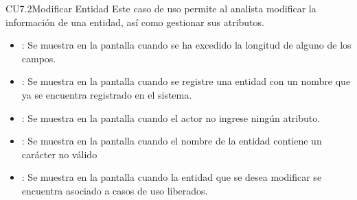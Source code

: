 \begin{UseCase}{CU7.2}{Modificar Entidad}{
		Este caso de uso permite al analista modificar la información de una entidad, así como gestionar sus atributos.
	}
{\begin{itemize}
		\item {}: Se muestra en la pantalla  cuando se ha excedido la longitud de alguno de los campos.
		\item {}: Se muestra en la pantalla  cuando se registre una entidad con un nombre que ya se encuentra registrado en el sistema.
		\item {}: Se muestra en la pantalla  cuando el actor no ingrese ningún atributo.
		\item {}: Se muestra en la pantalla  cuando el nombre de la entidad contiene un carácter no válido
		\item {}: Se muestra en la pantalla  cuando la entidad que se desea modificar se encuentra asociado a casos de uso liberados.
		\end{itemize}
		}
	\end{UseCase}
